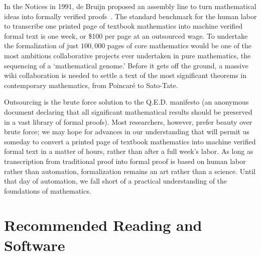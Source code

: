 \documentclass{llncs}
\begin{document}
\smallskip

In the Notices in 1991, de Bruijn proposed an assembly line
to turn mathematical ideas into formally verified proofs~\cite{dB91}.
The standard benchmark for the
human labor to transcribe one printed page
of textbook mathematics into machine verified formal text is one week, or \$100 per page at an outsourced wage. To undertake the formalization of just $100,000$ pages
of core mathematics 
would be one of the most ambitious collaborative projects ever undertaken in pure mathematics, the sequencing of a `mathematical genome.'
Before it gets off the ground, a massive wiki collaboration is needed to
 settle  a %
text of the most significant theorems in contemporary mathematics, from 
Poincar\'e to Sato-Tate.  %

Outsourcing is the brute force solution to the Q.E.D. manifesto
(an anonymous document declaring that all significant mathematical results should be preserved in a vast library of formal proofs).  Most researchers, however, prefer beauty over brute force;
we may hope for advances in our 
understanding that will permit us someday to convert a printed page of textbook mathematics into machine verified formal text in a matter of hours, rather than after a full week's labor.  As long as
transcription from traditional
proof into formal proof is based on human labor rather than
automation, formalization remains an art rather than a science.
Until that day of automation, %
we fall short of a practical understanding of the foundations of mathematics.





\section{Recommended Reading and Software}
\end{document}
